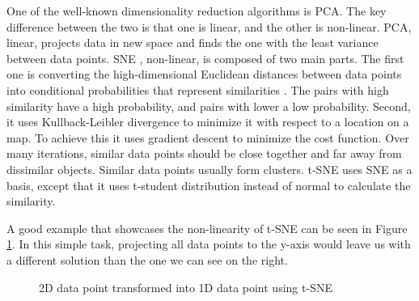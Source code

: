 One of the well-known dimensionality reduction algorithms is PCA.
The key difference between the two is that one is linear, and the other is non-linear.
PCA, linear, projects data in new space and finds the one with the least variance between data points.
SNE \cite{sne1}, non-linear, is composed of two main parts. The first one is 
converting the high-dimensional Euclidean distances between data points into conditional probabilities that represent similarities \cite{sne1}.
The pairs with high similarity have a high probability, and pairs with lower a low probability.
Second, it uses Kullback-Leibler divergence to minimize it with respect to a location on a map.
To achieve this it uses gradient descent to minimize the cost function.
Over many iterations, similar data points should be close together and far away from dissimilar objects.
Similar data points usually form clusters. 
t-SNE uses SNE as a basis, except that it uses t-student distribution instead of normal to calculate the similarity.

A good example that showcases the non-linearity of t-SNE can be seen in Figure \ref{fig:tsne_diagram}.
In this simple task, projecting all data points to the y-axis would leave us with a different solution than the one we can see on the right.
\begin{figure}[H]
    \centering
    \caption{2D data point transformed into 1D data point using t-SNE}
    \label{fig:tsne_diagram}
\end{figure}

